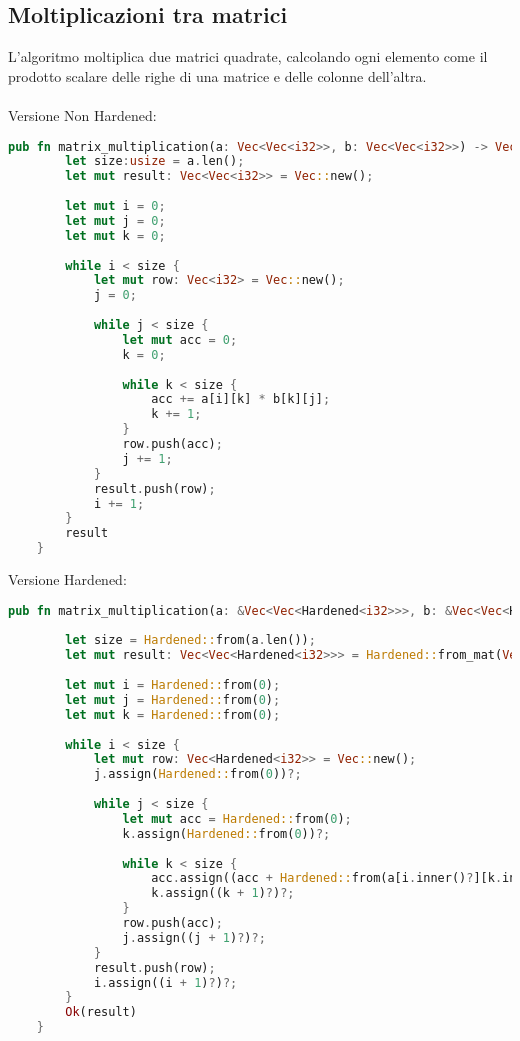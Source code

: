 \subsection{Moltiplicazioni tra matrici}
L'algoritmo moltiplica due matrici quadrate, calcolando ogni elemento come il prodotto scalare delle righe di una matrice e delle colonne dell'altra.
\\ \\Versione Non Hardened:
\begin{lstlisting}[language=rust, style=boxed] 
    pub fn matrix_multiplication(a: Vec<Vec<i32>>, b: Vec<Vec<i32>>) -> Vec<Vec<i32>> {
        let size:usize = a.len();
        let mut result: Vec<Vec<i32>> = Vec::new();
    
        let mut i = 0;
        let mut j = 0;
        let mut k = 0;
    
        while i < size {
            let mut row: Vec<i32> = Vec::new();
            j = 0;
    
            while j < size {
                let mut acc = 0;
                k = 0;
    
                while k < size {
                    acc += a[i][k] * b[k][j];
                    k += 1;
                }
                row.push(acc); 
                j += 1;
            }
            result.push(row);
            i += 1;
        }
        result
    }    
\end{lstlisting}
Versione Hardened:
\begin{lstlisting}[language=rust, style=boxed] 
    pub fn matrix_multiplication(a: &Vec<Vec<Hardened<i32>>>, b: &Vec<Vec<Hardened<i32>>>) -> Result<Vec<Vec<Hardened<i32>>>, IncoherenceError> {
    
        let size = Hardened::from(a.len());
        let mut result: Vec<Vec<Hardened<i32>>> = Hardened::from_mat(Vec::new());
    
        let mut i = Hardened::from(0);
        let mut j = Hardened::from(0);
        let mut k = Hardened::from(0);
    
        while i < size {
            let mut row: Vec<Hardened<i32>> = Vec::new();
            j.assign(Hardened::from(0))?;
    
            while j < size {
                let mut acc = Hardened::from(0);
                k.assign(Hardened::from(0))?;
    
                while k < size {
                    acc.assign((acc + Hardened::from(a[i.inner()?][k.inner()?].inner()?   *   b[k.inner()?][j.inner()?].inner()?) )? )?;
                    k.assign((k + 1)?)?;
                }
                row.push(acc); 
                j.assign((j + 1)?)?;
            }
            result.push(row); 
            i.assign((i + 1)?)?;
        }
        Ok(result)
    }
\end{lstlisting}